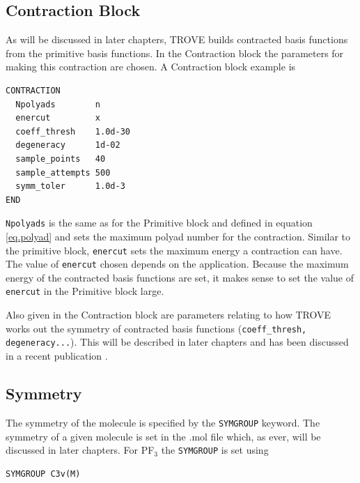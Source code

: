 \subsection{Contraction Block}
As will be discussed in later chapters, TROVE builds contracted basis functions from the primitive basis functions. 
In the Contraction block the parameters for making this contraction are chosen. A Contraction block example is 
\begin{verbatim}
CONTRACTION
  Npolyads        n
  enercut         x
  coeff_thresh    1.0d-30
  degeneracy      1d-02
  sample_points   40
  sample_attempts 500
  symm_toler      1.0d-3
END
\end{verbatim}
\verb|Npolyads| is the same as for the Primitive block and defined in equation \ref{eq.polyad} 
and sets the maximum polyad number for the contraction. 
Similar to the primitive block, \verb|enercut| sets the maximum energy a contraction can have. The value of \verb|enercut| chosen depends on the application. 
Because the maximum energy of the contracted basis functions are set, it makes sense to set the value of \verb|enercut| in the Primitive block large.

Also given in the Contraction block are parameters relating to how TROVE works out the symmetry
of contracted basis functions (\verb|coeff_thresh, degeneracy...|). This will be described in later chapters and has been discussed in a recent publication \cite{17YuYaOv.methods}.


\subsection{Symmetry}
The symmetry of the molecule is specified by the \verb|SYMGROUP| keyword. 
The symmetry of a given molecule is set in the .mol file which, as ever, will be discussed in later chapters. 
For PF$_3$ the \verb|SYMGROUP| is set using
\begin{verbatim}
SYMGROUP C3v(M)
\end{verbatim}

